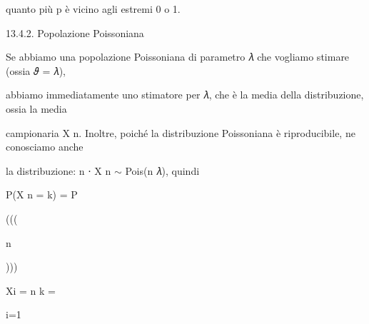 \documentclass[a4paper,portrait,12pt]{article}
\begin{document}
\begin{flushleft}
quanto più p \`{e} vicino agli estremi 0 o 1.
\end{flushleft}





\begin{flushleft}
13.4.2. Popolazione Poissoniana
\end{flushleft}


\begin{flushleft}
Se abbiamo una popolazione Poissoniana di parametro 𝜆 che vogliamo stimare (ossia 𝜗 = 𝜆),
\end{flushleft}


\begin{flushleft}
abbiamo immediatamente uno stimatore per 𝜆, che \`{e} la media della distribuzione, ossia la media
\end{flushleft}


\begin{flushleft}
campionaria X n. Inoltre, poich\'{e} la distribuzione Poissoniana \`{e} riproducibile, ne conosciamo anche
\end{flushleft}


\begin{flushleft}
la distribuzione: n ⋅ X n $\sim$ Pois(n 𝜆), quindi
\end{flushleft}


\begin{flushleft}
P(X n = k) = P
\end{flushleft}





(((





\begin{flushleft}
n
\end{flushleft}





)))





\begin{flushleft}
Xi = n k =
\end{flushleft}


\begin{flushleft}
i=1
\end{flushleft}
\end{document}
